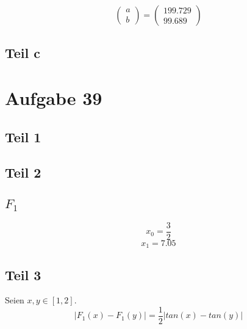 \documentclass[10pt,a4paper]{article}
\begin{document}
\begin{equation}
  \begin{pmatrix}
    a\\b
  \end{pmatrix}
  =
  \begin{pmatrix}
    199.729\\99.689
  \end{pmatrix}
\end{equation}

\subsection{Teil c}

\section{Aufgabe 39}

\subsection{Teil 1}

\subsection{Teil 2}

\subsection{$F_{1}$}

\begin{equation}
  x_{0} = \frac{3}{2}
\end{equation}
\begin{equation}
  x_{1} = 7.05
\end{equation}

\subsection{Teil 3}

Seien $x, y \in [1, 2]$.
\begin{equation}
  |F_{1}(x) - F_{1}(y)| = \frac{1}{2}|tan(x) - tan(y)|
\end{equation}
\end{document}
